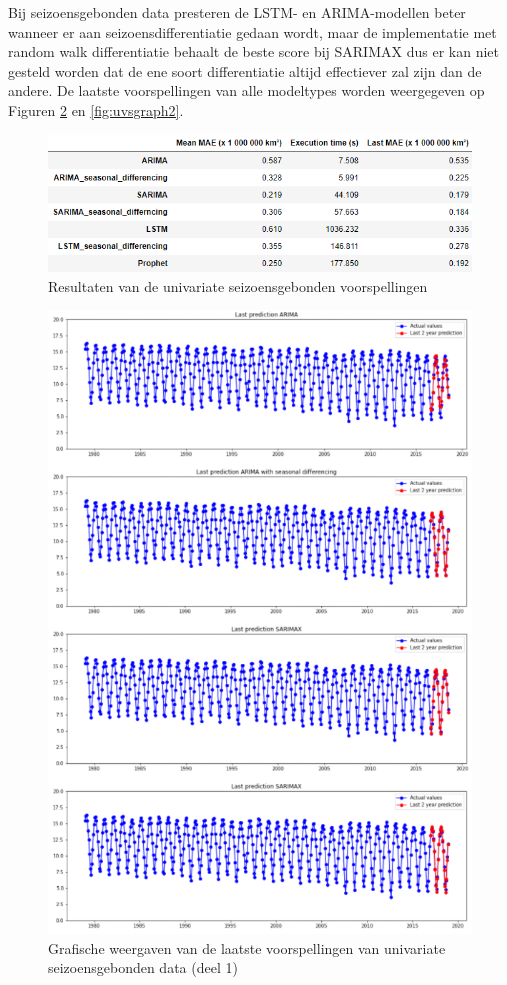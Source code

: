 Bij seizoensgebonden data presteren de LSTM- en ARIMA-modellen beter wanneer er aan seizoensdifferentiatie gedaan wordt, maar de implementatie met random walk differentiatie behaalt de beste score bij SARIMAX dus er kan niet gesteld worden dat de ene soort differentiatie altijd effectiever zal zijn dan de andere. De laatste voorspellingen van alle modeltypes worden weergegeven op Figuren \ref{fig:uvsgraph1} en \ref{fig:uvsgraph2}.


\begin{figure}
    \centering
    \caption{Resultaten van de univariate seizoensgebonden voorspellingen}
    \label{fig:uv_s_results}
    \includegraphics[width=0.9\linewidth]{uv_s_results}
\end{figure}

\begin{figure}
    \centering
    \caption{Grafische weergaven van de laatste voorspellingen van univariate seizoensgebonden data (deel 1)}
    \label{fig:uvsgraph1}
    \includegraphics[width=1\linewidth]{uv_s_graph1}
\end{figure}


